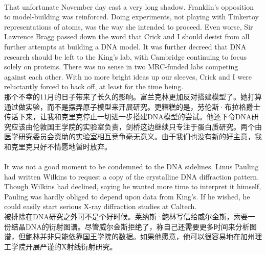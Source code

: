 \documentclass{article}
\begin{document}
\\
That unfortunate November day cast a very long shadow. Franklin’s opposition to model-building was reinforced. Doing experiments, not playing with Tinkertoy representations of atoms, was the way she intended to proceed. Even worse, Sir Lawrence Bragg passed down the word that Crick and I should desist from all further attempts at building a DNA model. It was further decreed that DNA research should be left to the King’s lab, with Cambridge continuing to focus solely on proteins. There was no sense in two MRC-funded labs competing against each other. With no more bright ideas up our sleeves, Crick and I were reluctantly forced to back off, at least for the time being.\\
那个不幸的11月的日子带来了长久的影响。富兰克林更加反对搭建模型了。她打算通过做实验，而不是摆弄原子模型来开展研究。更糟糕的是，劳伦斯·布拉格爵士传话下来，让我和克里克停止一切进一步搭建DNA模型的尝试。他还下令DNA研究应该由伦敦国王学院的实验室负责，剑桥这边继续只专注于蛋白质研究。两个由医学研究委员会资助的实验室相互竞争毫无意义。由于我们也没有新的好主意，我和克里克只好不情愿地暂时放弃。\\

\\
It was not a good moment to be condemned to the DNA sidelines. Linus Pauling had written Wilkins to request a copy of the crystalline DNA diffraction pattern. Though Wilkins had declined, saying he wanted more time to interpret it himself, Pauling was hardly obliged to depend upon data from King’s. If he wished, he could easily start serious X-ray diffraction studies at Caltech.\\
被排除在DNA研究之外可不是个好时候。莱纳斯·鲍林写信给威尔金斯，索要一份结晶DNA的衍射图谱。尽管威尔金斯拒绝了，称自己还需要更多时间来分析图谱，但鲍林并非只能依靠国王学院的数据。如果他愿意，他可以很容易地在加州理工学院开展严谨的X射线衍射研究。\\
\end{document}
